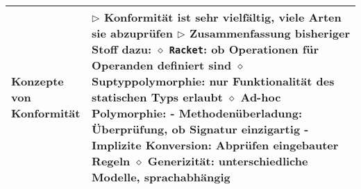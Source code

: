 \begin{longtable}{ | p{} p{} | }
	\makecell[l]{Konzepte von \\ Konformität} & \makecell[l]{
	$\triangleright$ Konformität ist sehr vielfältig, viele Arten sie abzuprüfen \\
	$\triangleright$ Zusammenfassung bisheriger Stoff dazu: \\
	\hspace{0.4cm} $\diamond$ \texttt{Racket}: ob Operationen für Operanden definiert sind \\
	\hspace{0.4cm} $\diamond$ Suptyppolymorphie: nur Funktionalität des statischen Typs erlaubt \\
	\hspace{0.4cm} $\diamond$ Ad-hoc Polymorphie: \\
	\hspace{0.6cm} - Methodenüberladung: Überprüfung, ob Signatur einzigartig \\
	\hspace{0.6cm} - Implizite Konversion: Abprüfen eingebauter Regeln \\
	\hspace{0.4cm} $\diamond$ Generizität: unterschiedliche Modelle, sprachabhängig} \\ \hline


\end{longtable}
